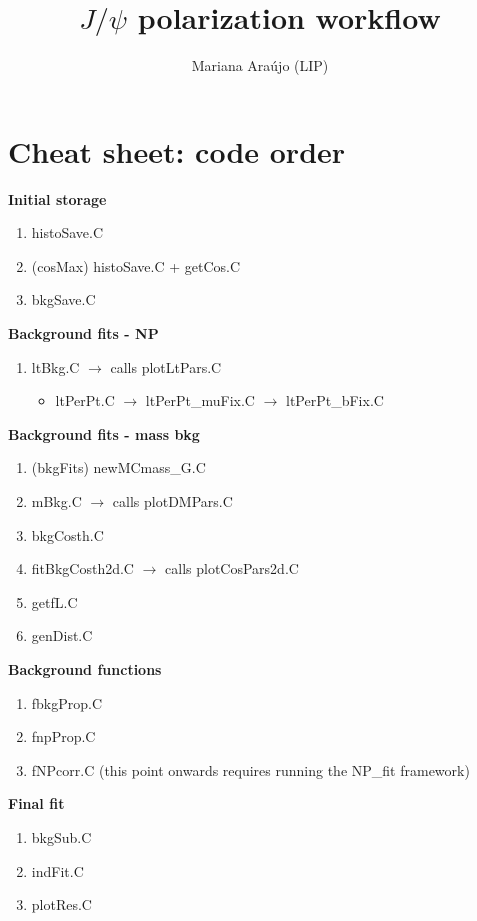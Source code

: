 \documentclass{article}
\begin{document}
\title{$J/\psi$ polarization workflow }
\author{Mariana Ara\'ujo (LIP)}
\maketitle

\tableofcontents

\pagebreak

\section{Cheat sheet: code order}


\textbf{Initial storage}
\begin{enumerate}
\item histoSave.C
\item (cosMax) histoSave.C + getCos.C
\item bkgSave.C
\end{enumerate}

\textbf{Background fits - NP}
\begin{enumerate}
\item ltBkg.C $\rightarrow$ calls plotLtPars.C
\begin{itemize}
\item ltPerPt.C $\rightarrow$ ltPerPt\_muFix.C $\rightarrow$ ltPerPt\_bFix.C
\end{itemize}
\end{enumerate}

\textbf{Background fits - mass bkg}
\begin{enumerate}
\item (bkgFits) newMCmass\_G.C
\item mBkg.C $\rightarrow$ calls plotDMPars.C
\item bkgCosth.C
\item fitBkgCosth2d.C $\rightarrow$ calls plotCosPars2d.C
\item getfL.C
\item genDist.C
\end{enumerate}

\textbf{Background functions}
\begin{enumerate}
\item fbkgProp.C
\item fnpProp.C
\item fNPcorr.C (this point onwards requires running the NP\_fit framework)
\end{enumerate}

\textbf{Final fit}
\begin{enumerate}
\item bkgSub.C
\item indFit.C
\item plotRes.C
\end{enumerate}
\end{document}
